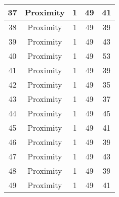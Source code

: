 \documentclass[results.tex]{subfiles}
\begin{document}
\begin{center}
\begin{tabular}{| c || c | c | c | c |}
            \hline
            37                      & Proximity                    & 1                      & 49                      & 41                   \\
            \hline
            38                      & Proximity                    & 1                      & 49                      & 39                   \\
            \hline
            39                      & Proximity                    & 1                      & 49                      & 43                   \\
            \hline
            40                      & Proximity                    & 1                      & 49                      & 53                   \\
            \hline
            41                      & Proximity                    & 1                      & 49                      & 39                   \\
            \hline
            42                      & Proximity                    & 1                      & 49                      & 35                   \\
            \hline
            43                      & Proximity                    & 1                      & 49                      & 37                   \\
            \hline
            44                      & Proximity                    & 1                      & 49                      & 45                   \\
            \hline
            45                      & Proximity                    & 1                      & 49                      & 41                   \\
            \hline
            46                      & Proximity                    & 1                      & 49                      & 39                   \\
            \hline
            47                      & Proximity                    & 1                      & 49                      & 43                   \\
            \hline
            48                      & Proximity                    & 1                      & 49                      & 39                   \\
            \hline
            49                      & Proximity                    & 1                      & 49                      & 41                   \\
            \hline
        \end{tabular}
    \end{center}
\end{document}

